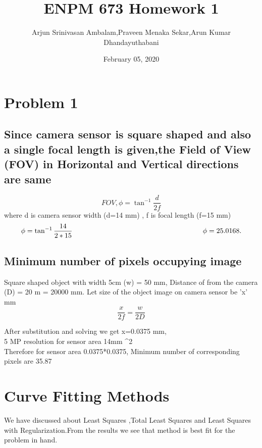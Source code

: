 \documentclass{article}
\title{ENPM 673 Homework 1}
\author{Arjun Srinivasan Ambalam,Praveen Menaka Sekar,Arun Kumar Dhandayuthabani}
\date{February 05, 2020}
\begin{document}
\maketitle




\section{Problem 1}


\subsection{Since camera sensor is square shaped and also a single focal length is given,the Field of View (FOV) in Horizontal and Vertical directions are same}
\begin{equation*}
FOV , \phi=\tan ^{-1} \frac{d}{2f}
\end{equation*}
 where d is camera sensor width (d=14 mm)
        , f is focal length (f=15 mm)
\begin{equation*}     
   \phi =\tan ^{ - 1}\frac{14}{2*15}
                    
                   \hspace{6.5cm} \phi =  25.0168.
\end{equation*}


\subsection{Minimum number of pixels occupying image}
Square shaped object with width 5cm (w) = 50 mm,
Distance of from the camera (D) = 20 m = 20000 mm.
Let size of the object image on camera sensor be 'x' mm
\begin{equation*}
 \frac{x}{2f}=\frac{w}{2D}
 \end{equation*}
\begin{flushleft}
After substitution and solving we get x=0.0375 mm,\\
5 MP resolution for sensor area 14\hspace{.1cm}mm ^2 \\
Therefore for sensor area \hspace{.1cm}0.0375*0.0375, Minimum number of corresponding pixels are 35.87
  
\end{flushleft}

\section{Curve Fitting Methods}
We have discussed about Least Squares ,Total Least Squares and Least Squares with Regularization.From the results we see that             method is best fit for the problem in hand. 
\end{document}
